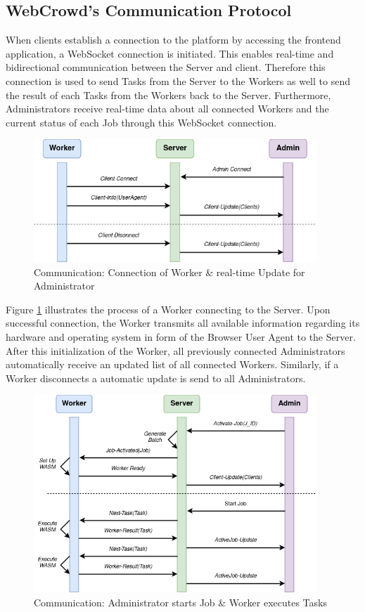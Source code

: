 \subsection{WebCrowd's Communication Protocol}
\label{subsec:implementation:architecture:communication}
When clients establish a connection to the platform by accessing the frontend application, a WebSocket connection is initiated. This enables real-time and bidirectional communication between the Server and client. Therefore this connection is used to send Tasks from the Server to the Workers as well to send the result of each Tasks from the Workers back to the Server. Furthermore, Administrators receive real-time data about all connected Workers and the current status of each Job through this WebSocket connection.
\begin{figure}[htbp]
    \centering
    \includegraphics[width=0.95\textwidth]{gfx/figures/communication-connection.png}
    \caption{Communication: Connection of Worker \& real-time Update for Administrator}
    \label{fig:implementation:communication1}
\end{figure}
Figure \ref{fig:implementation:communication1} illustrates the process of a Worker connecting to the Server. Upon successful connection, the Worker transmits all available information regarding its hardware and operating system in form of the Browser User Agent to the Server. After this initialization of the Worker, all previously connected Administrators automatically receive an updated list of all connected Workers. Similarly, if a Worker disconnects a automatic update is send to all Administrators.
\begin{figure}[htbp]
    \centering
    \includegraphics[width=0.95\textwidth]{gfx/figures/communication-jobexecution.png}
    \caption{Communication: Administrator starts Job \& Worker executes Tasks}
    \label{fig:implementation:communication2}
\end{figure}
